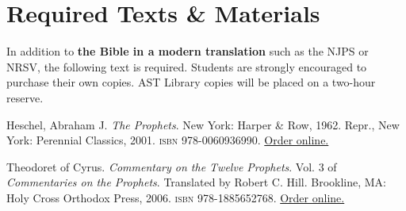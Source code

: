 \documentclass[titlepage]{article}
\newcommand\incl{../includes}
\begin{document}


%

\section{Required Texts \& Materials}
\label{texts}

In addition to \textbf{the Bible in a modern translation} such as the
NJPS or NRSV, the following text is required. Students are strongly
encouraged to purchase their own copies. AST Library copies will be
placed on a two-hour reserve.

\begingroup
\renewcommand{\section}[2]{}%
\begin{thebibliography}{Theodoret}%

	 Heschel, Abraham J.
	\emph{The Prophets}.
	New York: Harper \& Row, 1962. Repr., New York: Perennial Classics, 2001.
	\textsc{isbn} 978-0060936990. \href{https://amzn.to/46qhye3}{Order online.}

	 Theodoret of Cyrus.
	\emph{Commentary on the Twelve Prophets}. Vol. 3 of \emph{Commentaries on the Prophets}.
	Translated by Robert C. Hill.
	Brookline, MA: Holy Cross Orthodox Press, 2006.
	\textsc{isbn} 978-1885652768. \href{https://amzn.to/47kYajz}{Order online.}




\end{thebibliography}
\endgroup
\end{document}

